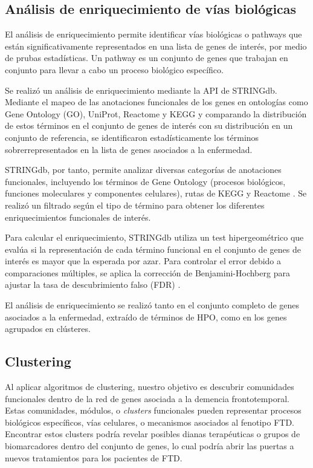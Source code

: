 \subsection{Análisis de enriquecimiento de vías biológicas}

El análisis de enriquecimiento permite identificar vías biológicas o pathways que están significativamente representados en una lista de genes de interés, por medio de prubas estadísticas. Un pathway es un conjunto de genes que trabajan en conjunto para llevar a cabo un proceso biológico específico.\cite{Reimand2019}

Se realizó un análisis de enriquecimiento mediante la API de STRINGdb. Mediante el mapeo de las anotaciones funcionales de los genes en ontologías como Gene Ontology (GO), UniProt, Reactome y KEGG y comparando la distribución de estos términos en el conjunto de genes de interés con su distribución en un conjunto de referencia, se identificaron estadísticamente los términos sobrerrepresentados en la lista de genes asociados a la enfermedad. \cite{Tipney2010}

STRINGdb, por tanto, permite analizar diversas categorías de anotaciones funcionales, incluyendo los términos de Gene Ontology (procesos biológicos, funciones moleculares y componentes celulares), rutas de KEGG y Reactome \cite{szklarczyk2023stringdb}. Se realizó un filtrado según el tipo de término para obtener los diferentes enriquecimientos funcionales de interés.

Para calcular el enriquecimiento, STRINGdb utiliza un test hipergeométrico que evalúa si la representación de cada término funcional en el conjunto de genes de interés es mayor que la esperada por azar. Para controlar el error debido a comparaciones múltiples, se aplica la corrección de Benjamini-Hochberg para ajustar la tasa de descubrimiento falso (FDR) \cite{szklarczyk2023stringdb}.

El análisis de enriquecimiento se realizó tanto en el conjunto completo de genes asociados a la enfermedad, extraído de términos de HPO, como en los genes agrupados en clústeres. 


\subsection{Clustering}

Al aplicar algoritmos de clustering, nuestro objetivo es descubrir comunidades funcionales dentro de la red de genes asociada a la demencia frontotemporal. Estas comunidades, módulos, o \textit{clusters} funcionales pueden representar procesos biológicos específicos, vías celulares, o mecanismos asociados al fenotipo FTD. Encontrar estos clusters podría revelar posibles dianas terapéuticas o grupos de biomarcadores dentro del conjunto de genes, lo cual podría abrir las puertas a nuevos tratamientos para los pacientes de FTD.

